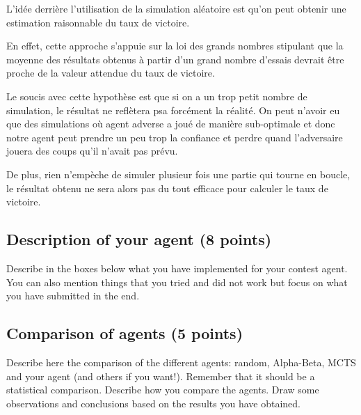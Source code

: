 \documentclass[11pt,a4paper]{report}
\begin{document}
\begin{answers}[15cm]
L'idée derrière l'utilisation de la simulation aléatoire est qu'on peut obtenir une estimation raisonnable du taux de victoire.

En effet, cette approche s'appuie sur la loi des grands nombres stipulant que la moyenne des résultats obtenus à partir d'un grand nombre d'essais devrait être proche de la valeur attendue du taux de victoire.

Le soucis avec cette hypothèse est que si on a un trop petit nombre de simulation, le résultat ne reflètera psa forcément la réalité. On peut n'avoir eu que des simulations où agent adverse a joué de manière sub-optimale et donc notre agent peut prendre un peu trop la confiance et perdre quand l'adversaire jouera des coups qu'il n'avait pas prévu.

De plus, rien n'empèche de simuler plusieur fois une partie qui tourne en boucle, le résultat obtenu ne sera alors pas du tout efficace pour calculer le taux de victoire.
\end{answers}


\newpage
\subsection{Description of your agent (8 points)}
Describe in the boxes below what you have implemented for your contest agent. You can also mention things that you tried and did not work but focus on what you have submitted in the end.

\begin{answers}[21cm]
\end{answers}

\begin{answers}[23cm]
\end{answers}

\begin{answers}[23cm]
\end{answers}



\newpage
\subsection{Comparison of agents (5 points)}
Describe here the comparison of the different agents: random, Alpha-Beta, MCTS and your agent (and others if you want!). Remember that it should be a statistical comparison. Describe how you compare the agents. Draw some observations and conclusions based on the results you have obtained.
\end{document}
